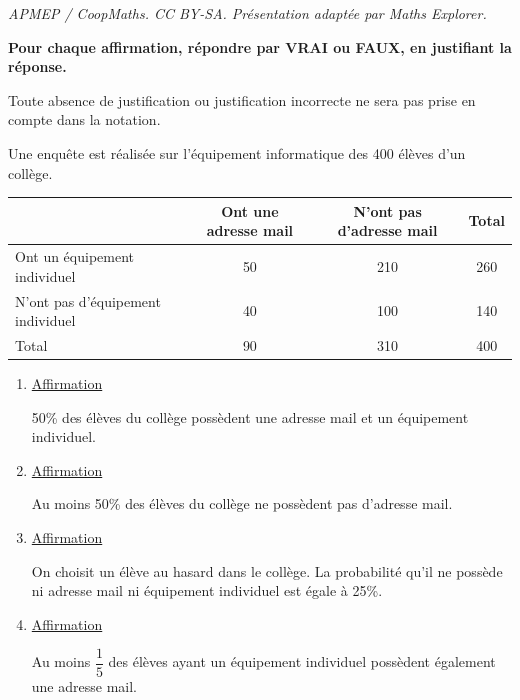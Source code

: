 \documentclass[10pt]{article}
\begin{document}
\noindent\textit{APMEP / CoopMaths. CC BY-SA. Présentation adaptée par Maths Explorer.}\par\medskip
\par
\textbf{Pour chaque affirmation, répondre par VRAI ou FAUX, en justifiant la réponse.}\par
Toute absence de justification ou justification incorrecte ne sera pas prise en compte dans la notation.

Une enquête est réalisée sur l'équipement informatique des 400 élèves d'un collège.
\begin{center}\renewcommand{\arraystretch}{1.35}
\begin{tabular}{|p{3.2cm}|c|c|c|}\hline
& Ont une adresse mail & N'ont pas d'adresse mail & Total\\\hline
Ont un équipement individuel & 50 & 210 & 260\\\hline
N'ont pas d'équipement individuel & 40 & 100 & 140\\\hline
Total & 90 & 310 & 400\\\hline
\end{tabular}
\end{center}

\begin{enumerate}
\item \underline{Affirmation}

50\% des élèves du collège possèdent une adresse mail et un équipement individuel.

\item \underline{Affirmation}

Au moins 50\% des élèves du collège ne possèdent pas d'adresse mail.

\item \underline{Affirmation}

On choisit un élève au hasard dans le collège. La probabilité qu'il ne possède ni adresse mail ni équipement individuel est égale à 25\%.

\item \underline{Affirmation}

Au moins $\dfrac{1}{5}$ des élèves ayant un équipement individuel possèdent également une adresse mail.
\end{enumerate}
\end{document}
